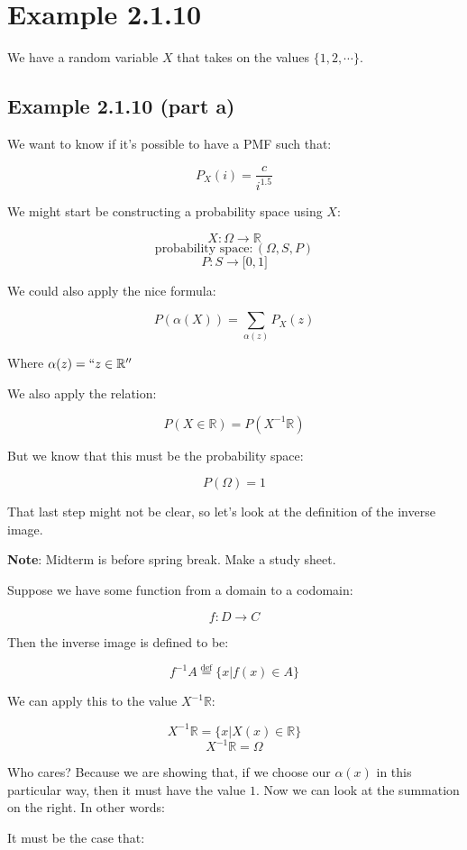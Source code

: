 \documentclass{article}
\newcommand{\inv}[1]{#1^{-1}}
\begin{document}
\section*{Example 2.1.10}

We have a random variable $X$ that takes on the values
$\{1,2,\cdots\}$.

\subsection*{Example 2.1.10 (part a)}

We want to know if it's possible to have a PMF such that:

\[
P_X(i)=\frac{c}{i^{1.5}}
\]

We might start be constructing a probability space using $X$:

\[
X:\Omega\rightarrow\mathbb{R}
\] \[
\text{probability space}: (\Omega,S,P)
\] \[
P:S\rightarrow\lbrack0,1\rbrack
\]

We could also apply the nice formula:

\[
P(\alpha(X))=\sum\limits_{\alpha(z)}P_X(z)
\]

Where $\alpha(z)=``z\in\mathbb{R}''$

We also apply the relation:

\[
P(X\in\mathbb{R})=P(\inv{X}\mathbb{R})
\]

But we know that this must be the probability space:

\[
P(\Omega)=1
\]

That last step might not be clear, so let's look at the definition of
the inverse image.

\textbf{Note}: Midterm is before spring break. Make a study sheet.

Suppose we have some function from a domain to a codomain:

\[
f:D\rightarrow C
\]

Then the inverse image is defined to be:

\[
\inv{f}A\overset{\text{def}}{=}\{x|f(x)\in A\}
\]

We can apply this to the value $\inv{X}\mathbb{R}$:

\[
\inv{X}\mathbb{R}=\{x|X(x)\in\mathbb{R}\}
\] \[
\inv{X}\mathbb{R}=\Omega
\]

Who cares? Because we are showing that, if we choose our $\alpha(x)$
in this particular way, then it must have the value $1$. Now we can
look at the summation on the right. In other words:

It must be the case that:
\end{document}
